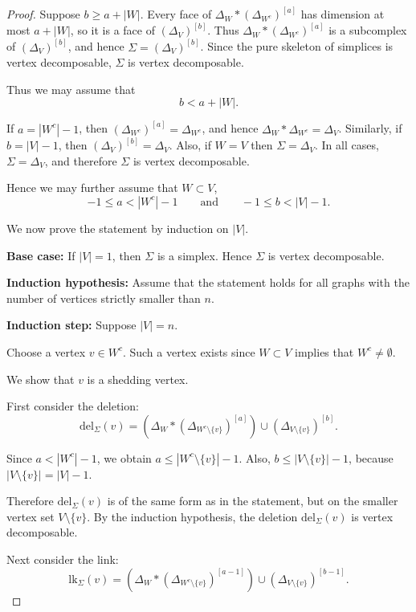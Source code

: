 \documentclass[12pt,reqno]{amsart}
\theoremstyle{definition}
\newcommand{\lk}{{\mathrm{lk}}}
\newcommand{\del}{{\mathrm{del}}}
\begin{document}
\begin{proof}
Suppose $b \ge a+|W|$. Every face of $\Delta_W * (\Delta_{W^c})^{[a]}$ has dimension at most $a+|W|$, so it is a face of $(\Delta_V)^{[b]}$. Thus $\Delta_W * (\Delta_{W^c})^{[a]}$ is a subcomplex of $(\Delta_V)^{[b]}$, and hence $\Sigma=(\Delta_V)^{[b]}$. Since the pure skeleton of simplices is vertex decomposable, $\Sigma$ is vertex decomposable.

Thus we may assume that
\[
b<a+|W|.
\]

If $a=|W^c|-1$, then $(\Delta_{W^c})^{[a]}=\Delta_{W^c}$, and hence $\Delta_W * \Delta_{W^c} = \Delta_V$. Similarly, if $b=|V|-1$, then $(\Delta_V)^{[b]}=\Delta_V$. Also, if $W = V$ then $\Sigma = \Delta_V$. In all cases, $\Sigma=\Delta_V$, and therefore $\Sigma$ is vertex decomposable.

Hence we may further assume that $W \subset V$, 
\[
-1\le a<|W^c|-1
\qquad \text{and} \qquad
-1\le b<|V|-1.
\]

We now prove the statement by induction on $|V|$.

\medskip

\noindent
\textbf{Base case:}
If $|V|=1$, then $\Sigma$ is a simplex. Hence $\Sigma$ is vertex decomposable.

\medskip
\noindent
\textbf{Induction hypothesis:}
Assume that the statement holds for all graphs with the number of vertices strictly smaller than $n$.

\medskip

\noindent
\textbf{Induction step:}
Suppose $|V|=n$.

Choose a vertex $v \in W^c$. 
Such a vertex exists since $W \subset V$ implies that $W^c\neq \emptyset$.

We show that $v$ is a shedding vertex.

First consider the deletion:
\[
\del_\Sigma(v)
=
\left(
\Delta_W * (\Delta_{W^c\setminus\{v\}})^{[a]}
\right)
\cup
(\Delta_{V\setminus\{v\}})^{[b]}.
\]

Since $a<|W^c|-1$, we obtain $a\le |W^c\setminus\{v\}|-1$. 
Also, $b\le |V\setminus\{v\}|-1$, because $|V\setminus\{v\}|=|V|-1$.

Therefore $\del_\Sigma(v)$ is of the same form as in the statement, but on the smaller vertex set $V\setminus\{v\}$. 
By the induction hypothesis, the deletion $\del_\Sigma(v)$ is vertex decomposable.

Next consider the link:
\[
\lk_\Sigma(v)
=
\left(
\Delta_W * (\Delta_{W^c\setminus\{v\}})^{[a-1]}
\right)
\cup
(\Delta_{V\setminus\{v\}})^{[b-1]}.
\]


\end{proof}
\end{document}
